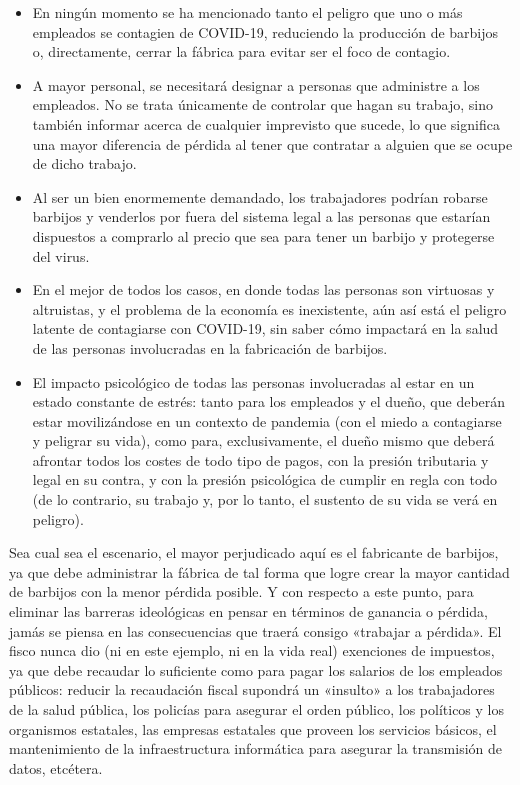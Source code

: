 \documentclass[12pt,a4paper,twoside]{book}
\begin{document}
\begin{itemize}
\item En ningún momento se ha mencionado tanto el peligro que uno o más empleados se contagien de COVID-19, reduciendo la producción de barbijos o, directamente, cerrar la fábrica para evitar ser el foco de contagio.
\item A mayor personal, se necesitará designar a personas que administre a los empleados. No se trata únicamente de controlar que hagan su trabajo, sino también informar acerca de cualquier imprevisto que sucede, lo que significa una mayor diferencia de pérdida al tener que contratar a alguien que se ocupe de dicho trabajo.
\item Al ser un bien enormemente demandado, los trabajadores podrían robarse barbijos y venderlos por fuera del sistema legal a las personas que estarían dispuestos a comprarlo al precio que sea para tener un barbijo y protegerse del virus.
\item En el mejor de todos los casos, en donde todas las personas son virtuosas y altruistas, y el problema de la economía es inexistente, aún así está el peligro latente de contagiarse con COVID-19, sin saber cómo impactará en la salud de las personas involucradas en la fabricación de barbijos.
\item El impacto psicológico de todas las personas involucradas al estar en un estado constante de estrés: tanto para los empleados y el dueño, que deberán estar movilizándose en un contexto de pandemia (con el miedo a contagiarse y peligrar su vida), como para, exclusivamente, el dueño mismo que deberá afrontar todos los costes de todo tipo de pagos, con la presión tributaria y legal en su contra, y con la presión psicológica de cumplir en regla con todo (de lo contrario, su trabajo y, por lo tanto, el sustento de su vida se verá en peligro).
\end{itemize}

Sea cual sea el escenario, el mayor perjudicado aquí es el fabricante de barbijos, ya que debe administrar la fábrica de tal forma que logre crear la mayor cantidad de barbijos con la menor pérdida posible. Y con respecto a este punto, para eliminar las barreras ideológicas en pensar en términos de ganancia o pérdida, jamás se piensa en las consecuencias que traerá consigo «trabajar a pérdida». El fisco nunca dio (ni en este ejemplo, ni en la vida real) exenciones de impuestos, ya que debe recaudar lo suficiente como para pagar los salarios de los empleados públicos: reducir la recaudación fiscal supondrá un «insulto» a los trabajadores de la salud pública, los policías para asegurar el orden público, los políticos y los organismos estatales, las empresas estatales que proveen los servicios básicos, el mantenimiento de la infraestructura informática para asegurar la transmisión de datos, etcétera.
\end{document}
